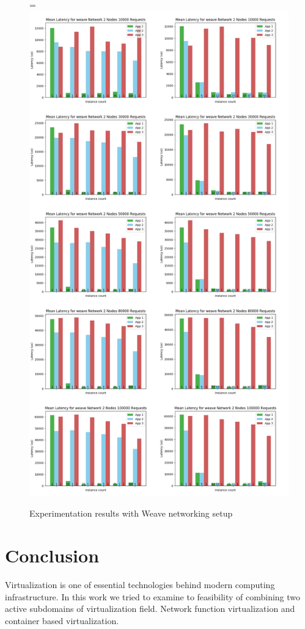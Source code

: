 \documentclass[12pt,oneandhalf,chaparabic,ceng,ms,eng,oneside,pntc]{gsufbe}
\makeatletter
\let\old@includegraphics\includegraphics
\renewcommand{\includegraphics}[2][,]{%
  \setbox9=\hbox{\old@includegraphics[#1]{#2}}%
  \ifdim\wd9>\textwidth
    \old@includegraphics[#1,width=\textwidth]{#2}%
  \else
    \old@includegraphics[#1]{#2}%
  \fi%
}
\makeatother
\begin{document}
\begin{figure}
\centering
\includegraphics[]{weave.png}
\caption{Experimentation results with Weave networking setup}
\label{rnp1}
\end{figure}

\chapter{Conclusion}
Virtualization is one of essential technologies behind modern computing infrastructure. In this work we
tried to examine to feasibility of combining two active subdomains of virtualization field. Network
function virtualization and container based virtualization.
\end{document}

